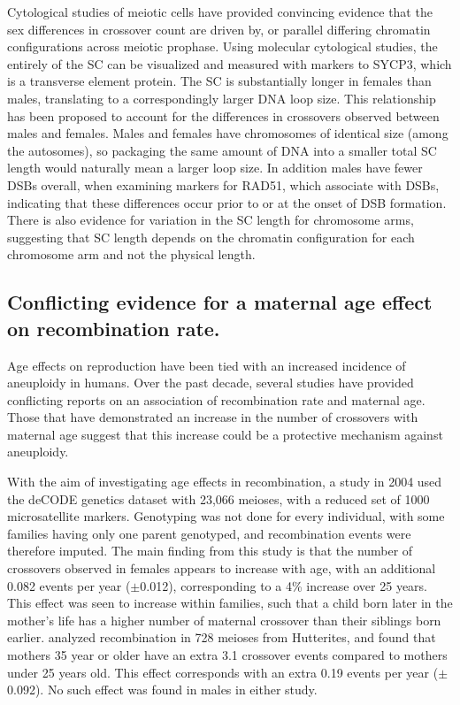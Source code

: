 Cytological studies of meiotic cells have provided convincing evidence that the sex differences in crossover count are driven by, or parallel differing chromatin configurations across meiotic prophase.
Using molecular cytological studies, the entirely of the SC can be visualized and measured with markers to SYCP3, which is a transverse element protein.
The SC is substantially longer in females than males, translating to a correspondingly larger DNA loop size\cite{Tease2004,Gruhn2013}.
This relationship has been proposed to account for the differences in crossovers observed between males and females.
Males and females have chromosomes of identical size (among the autosomes), so packaging the same amount of DNA into a smaller total SC length would naturally mean a larger loop size.
In addition males have fewer DSBs overall, when examining markers for RAD51, which associate with DSBs, indicating that these differences occur prior to or at the onset of DSB formation\cite{Gruhn2013}.
There is also evidence for variation in the SC length for chromosome arms, suggesting that SC length depends on the chromatin configuration for each chromosome arm and not the physical length\cite{Codina-Pascual2006a}.

\subsection{Conflicting evidence for a maternal age effect on recombination rate.}

Age effects on reproduction have been tied with an increased incidence of aneuploidy in humans\cite{Hassold2001,Hassold2007}.
Over the past decade, several studies have provided conflicting reports on an association of recombination rate and maternal age.
Those that have demonstrated an increase in the number of crossovers with maternal age suggest that this increase could be a protective mechanism against aneuploidy.

With the aim of investigating age effects in recombination, a study in 2004 used the deCODE genetics dataset with 23,066 meioses, with a reduced set of 1000 microsatellite markers\cite{Kong2004}.
Genotyping was not done for every individual, with some families having only one parent genotyped, and recombination events were therefore imputed.
The main finding from this study is that the number of crossovers observed in females appears to increase with age, with an additional 0.082 events per year ($\pm$0.012), corresponding to a 4\% increase over 25 years.
This effect was seen to increase within families, such that a child born later in the mother's life has a higher number of maternal crossover than their siblings born earlier.
\citet{Coop2008} analyzed recombination in 728 meioses from Hutterites, and found that mothers 35 year or older have an extra 3.1 crossover events compared to mothers under 25 years old.
This effect corresponds with an extra 0.19 events per year ($\pm$0.092).
No such effect was found in males in either study.

